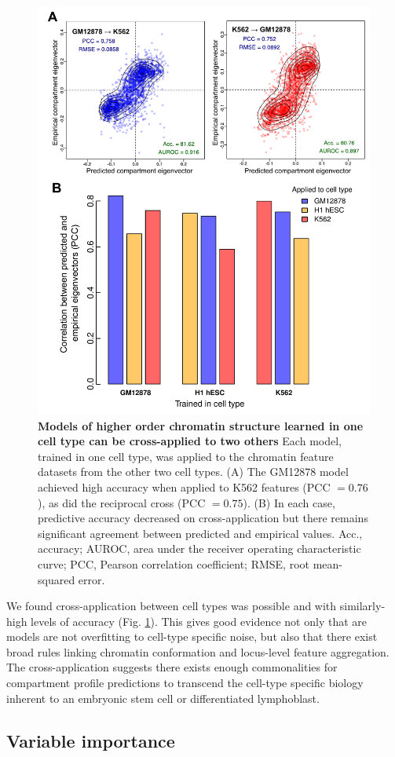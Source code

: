 \documentclass[a4paper,11pt,oneside]{book}
\begin{document}
\begin{figure}
\begin{center} 
\includegraphics[width=.6\textwidth]{figs/xapp.pdf}
\captionsetup{width=\textwidth} 
\caption{ {\bf Models of higher order chromatin structure learned in one cell type can be cross-applied to two others }
 Each model, trained in one cell type, was applied to the chromatin feature datasets from the other two cell types. (A) The GM12878 model achieved high accuracy when applied to K562 features (PCC $= 0.76$), as did the reciprocal cross (PCC $= 0.75$). (B) In each case, predictive accuracy decreased on cross-application but there remains significant agreement between predicted and empirical values. Acc., accuracy; AUROC, area under the receiver operating characteristic curve; PCC, Pearson correlation coefficient; RMSE, root mean-squared error.
}\label{fig:xapp}
\end{center} 
\end{figure} 

We found cross-application between cell types was possible and with similarly-high levels of accuracy (Fig. \ref{fig:xapp}). This gives good evidence not only that are models are not overfitting to cell-type specific noise, but also that there exist broad rules linking chromatin conformation and locus-level feature aggregation. The cross-application suggests there exists enough commonalities for compartment profile predictions to transcend the cell-type specific biology inherent to an embryonic stem cell or differentiated lymphoblast.

\subsection{Variable importance}
\end{document}
